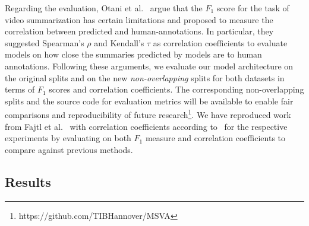 \documentclass{article}
\begin{document}
Regarding the evaluation, Otani et al.~\cite{DBLP:conf/cvpr/OtaniNRH19} argue that the $F_{1}$ score for the task of video summarization has certain limitations and proposed to measure the correlation between predicted and human-annotations.
In particular, they suggested Spearman’s $\rho$ and Kendall’s $\tau$ as correlation coefficients to evaluate models on how close the summaries predicted by models are to human annotations. Following these arguments, we evaluate our model architecture on the original splits and on the new \textit{non-overlapping} splits for both datasets in terms of $F_{1}$ scores and correlation coefficients. 
The corresponding non-overlapping splits and the source code for evaluation metrics will be available to enable fair comparisons and reproducibility of future research\footnote{https://github.com/TIBHannover/MSVA}.  
We have reproduced work from Fajtl et al.~\cite{DBLP:conf/accv/FajtlSAMR18} with correlation coefficients according to~\cite{DBLP:journals/corr/abs-2006-01410, DBLP:conf/cvpr/OtaniNRH19} for the respective experiments by evaluating on both $F_{1}$ measure and correlation coefficients to compare against previous methods.


\subsection{Results}
\end{document}
